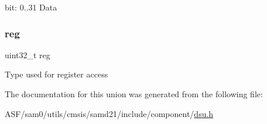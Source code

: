 bit\+: 0..31 Data \mbox{\label{union_d_s_u___d_c_c___type_a6b91636401516a477989a336376d7b40}} 
\subsubsection{\texorpdfstring{reg}{reg}}
{\footnotesize\ttfamily uint32\+\_\+t reg}

Type used for register access 

The documentation for this union was generated from the following file\+:\begin{DoxyCompactItemize}
\item 
A\+S\+F/sam0/utils/cmsis/samd21/include/component/\mbox{\hyperlink{component_2dsu_8h}{dsu.\+h}}\end{DoxyCompactItemize}
